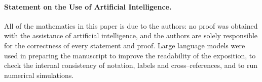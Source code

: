 \documentclass[11pt]{article}
\theoremstyle{plain}  %
\begin{document}
\paragraph{Statement on the Use of Artificial Intelligence.}
All of the mathematics in this paper is due to the authors: no proof was obtained with the assistance of artificial intelligence, and the authors are solely
responsible for the correctness of every statement and proof. Large language models were used in preparing the manuscript to improve the readability of
the exposition, to check the internal consistency of notation, labels and
cross--references, and to run numerical simulations.




\printbibliography
\end{document}
